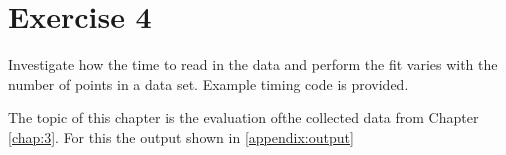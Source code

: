 \chapter{Exercise 4}
\label{chap:4}

Investigate how the time to read in the data and perform the fit varies with
the number of points in a data set. Example timing code is provided.

The topic of this chapter is the evaluation ofthe collected data from Chapter \ref{chap:3}. For this the output shown in \ref{appendix:output} 